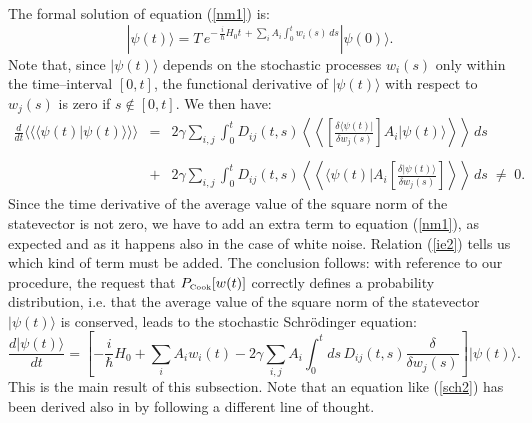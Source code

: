 \documentclass[12pt]{article}
\newcommand{\llangle}{\langle\!\langle}
\newcommand{\rrangle}{\rangle\!\rangle}
\newcommand{\LLangle}{\left\langle\!\!\!\left\langle}
\newcommand{\RRangle}{\right\rangle\!\!\!\right\rangle}
\begin{document}
The formal solution of equation (\ref{nm1}) is:
\begin{equation} \label{fs}
|\psi(t)\rangle = T\, e^{\displaystyle -\, \frac{i}{\hbar}H_{0}
t\, + \sum_{i} A_{i} \int_{0}^{t} w_{i}(s)\, ds }|\psi(0)\rangle.
\end{equation}
Note that, since $|\psi(t)\rangle$ depends on the stochastic
processes $w_{i}(s)$ only within the time--interval $[0,t]$, the
functional derivative of $|\psi(t)\rangle$ with respect to
$w_{j}(s)$ is zero if $s \not\in [0,t]$. We then have:
\begin{eqnarray} \label{ie2}
\frac{d}{dt}\llangle\langle\psi(t)|\psi(t)\rangle\rrangle & = &
2\gamma \sum_{i,j} \int_{0}^{t} D_{ij}(t,s) \LLangle \left[
\frac{\delta \langle\psi(t)|}{\delta w_{j}(s)}\right]
A_{i}|\psi(t)\rangle\RRangle \,ds \nonumber \\ &  &  \\ & + &
2\gamma \sum_{i,j} \int_{0}^{t} D_{ij}(t,s) \LLangle
\langle\psi(t)|A_{i} \left[ \frac{\delta |\psi(t)\rangle}{\delta
w_{j}(s)} \right]\RRangle \, ds \; \neq \; 0. \nonumber
\end{eqnarray}
Since the time derivative of the average value of the square norm
of the statevector is not zero, we have to add an extra term to
equation (\ref{nm1}), as expected and as it happens also in the
case of white noise. Relation (\ref{ie2}) tells us which kind of
term must be added. The conclusion follows: with reference to our
procedure, the request that $P_{\makebox{\tiny Cook}}[w(t)]$
correctly defines a probability distribution, i.e. that the
average value of the square norm of the statevector
$|\psi(t)\rangle$ is conserved, leads to the stochastic
Schr\"odinger equation:
\begin{equation}\label{sch2}
\frac{d|\psi(t)\rangle}{dt} =  \left[ -\frac{i}{\hbar} H_{0} +
\sum_{i} A_{i} w_{i}(t) - 2\gamma \sum_{i,j}A_{i} \int_{0}^{t}
ds\, D_{ij}(t,s) \frac{\delta}{\delta w_{j}(s)} \right]
|\psi(t)\rangle.
\end{equation}
This is the main result of this subsection. Note that an equation
like (\ref{sch2}) has been derived also in \cite{gi2wq, bud} by
following a different line of thought.
\end{document}
